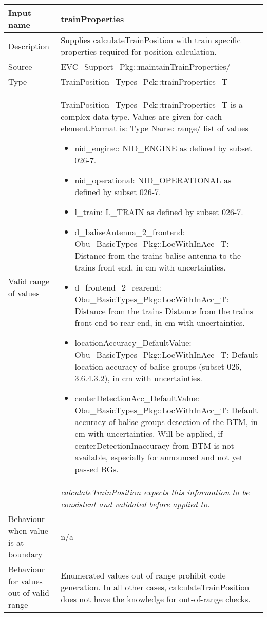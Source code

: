 \begin{longtable}{p{}p{}}
\toprule
Input name				& trainProperties \\

\midrule
Description				& Supplies calculateTrainPosition with train specific properties required for position calculation. \newline
  \\
\midrule
Source					& EVC\_Support\_Pkg::maintainTrainProperties/ \\ 
\midrule
Type					& TrainPosition\_Types\_Pck::trainProperties\_T \\  
\midrule
Valid range of values	& TrainPosition\_Types\_Pck::trainProperties\_T is a complex data type. Values are given for each element.\newline Format is: Type Name: range/ list of values
\begin{itemize}
\item nid\_engine:: NID\_ENGINE as defined by subset 026-7. 
\item nid\_operational: NID\_OPERATIONAL as defined by subset 026-7. 
\item l\_train: L\_TRAIN as defined by subset 026-7. 

\item d\_baliseAntenna\_2\_frontend: Obu\_BasicTypes\_Pkg::LocWithInAcc\_T:  Distance from the trains balise antenna to the trains front end, in cm with uncertainties. 

\item d\_frontend\_2\_rearend: Obu\_BasicTypes\_Pkg::LocWithInAcc\_T:  Distance from the trains Distance from the trains front end to rear end, in cm with uncertainties. 

\item locationAccuracy\_DefaultValue: Obu\_BasicTypes\_Pkg::LocWithInAcc\_T:  Default location accuracy of balise groups (subset 026, 3.6.4.3.2), in cm with uncertainties. 

\item centerDetectionAcc\_DefaultValue: Obu\_BasicTypes\_Pkg::LocWithInAcc\_T:  Default  accuracy of balise groups detection of the BTM, in cm with uncertainties. Will be applied, if centerDetectionInaccuracy from BTM is not available, especially for announced and not yet passed BGs. 

\end{itemize}  \\

                     	&  \emph{calculateTrainPosition expects this information to be consistent and validated before applied to.}
\\

\midrule
Behaviour when value is at boundary	& n/a \\
\midrule
Behaviour for values out of valid range	& Enumerated values out of range prohibit code generation. In all other cases, calculateTrainPosition does not have the knowledge for out-of-range checks. \\

\bottomrule
\end{longtable}



